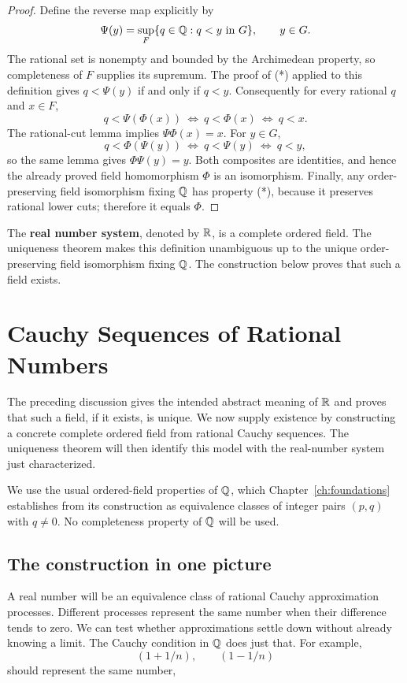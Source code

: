 \begin{proof}
Define the reverse map explicitly by
\[
\Psi(y)=\sup_F\{q\in\mathbb{Q}:q<y\text{ in }G\},\qquad y\in G.
\]
The rational set is nonempty and bounded by the Archimedean property, so
completeness of $F$ supplies its supremum. The proof of (*) applied to
this definition gives $q<\Psi(y)$ if and only if $q<y$.
Consequently for every rational $q$ and $x\in F$,
\[
q<\Psi(\Phi(x))\ \Longleftrightarrow\ q<\Phi(x)
\ \Longleftrightarrow\ q<x.
\]
The rational-cut lemma implies $\Psi\Phi(x)=x$. For $y\in G$,
\[
q<\Phi(\Psi(y))\ \Longleftrightarrow\ q<\Psi(y)
\ \Longleftrightarrow\ q<y,
\]
so the same lemma gives $\Phi\Psi(y)=y$. Both composites are identities,
and hence the already proved field homomorphism $\Phi$ is an isomorphism.
Finally, any order-preserving field isomorphism fixing \(\mathbb{Q}\) has property
(*), because it preserves rational lower cuts; therefore it equals \(\Phi\).
\end{proof}

\begin{definition}
\label{def:real-by-characterization}
The \textbf{real number system}, denoted by \(\mathbb{R}\), is a complete ordered
field. The uniqueness theorem makes this definition unambiguous up to the
unique order-preserving field isomorphism fixing \(\mathbb{Q}\).  The construction
below proves that such a field exists.
\end{definition}


\section{Cauchy Sequences of Rational Numbers}

The preceding discussion gives the intended abstract meaning of $\mathbb{R}$ and proves that such a field, if it exists, is unique. We now supply existence by constructing a concrete complete ordered field from rational Cauchy sequences. The uniqueness theorem will then identify this model with the real-number system just characterized.

We use the usual ordered-field properties of $\mathbb{Q}$, which Chapter~\ref{ch:foundations} establishes from its construction as equivalence classes of integer pairs $(p,q)$ with $q\ne0$.  No completeness property of $\mathbb{Q}$ will be used.


\subsection*{The construction in one picture}
A real number will be an equivalence class of rational Cauchy approximation
processes. Different processes represent the same number when their difference
tends to zero. We can test whether approximations settle down without already
knowing a limit. The Cauchy condition in $\mathbb{Q}$ does just that.
For example,
\[
(1+1/n),\qquad (1-1/n)
\]
 should represent the same number,

